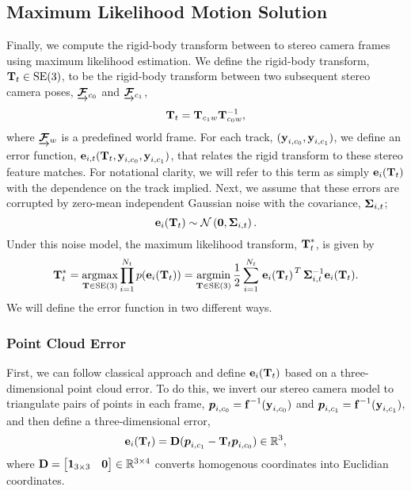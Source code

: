 \subsection{Maximum Likelihood Motion Solution}
Finally, we compute the rigid-body transform between to stereo camera frames using maximum likelihood estimation. We define the rigid-body transform, $\boldsymbol{\mathbf{T}}_t \in\text{SE}(3)$, to be the rigid-body transform between two subsequent stereo camera poses, 
$\underrightarrow{ \boldsymbol{\mathbf{\mathcal{F}}} }_{c_0}$ and  $\underrightarrow{ \boldsymbol{\mathbf{\mathcal{F}}} }_{c_1}$, 
\begin{equation}
	\boldsymbol{\mathbf{T}}_t = \boldsymbol{\mathbf{T}}_{c_1w} \boldsymbol{\mathbf{T}}^{-1}_{c_0w},
\end{equation}
where $\underrightarrow{ \boldsymbol{\mathbf{\mathcal{F}}} }_{w}$ is a predefined world frame. For each track, $(\boldsymbol{\mathbf{y}}_{i, c_0}, \boldsymbol{\mathbf{y}}_{i, c_1})$, we define an error function, $\boldsymbol{\mathbf{e}}_{i,t}(\boldsymbol{\mathbf{T}}_t, \boldsymbol{\mathbf{y}}_{i, c_0}, \boldsymbol{\mathbf{y}}_{i, c_1})$, that relates the rigid transform to these stereo feature matches. For notational clarity, we will refer to this term as simply $\boldsymbol{\mathbf{e}}_{i}(\boldsymbol{\mathbf{T}}_t)$ with the dependence on the track implied. Next, we assume that these errors are corrupted by zero-mean independent Gaussian noise with the covariance, $\boldsymbol{\mathbf{\Sigma}}_{i,t}$;
 \begin{equation}
  \boldsymbol{\mathbf{e}}_{i}(\boldsymbol{\mathbf{T}}_t) \sim
 \mathcal{N}\left(\boldsymbol{\mathbf{0}}, \boldsymbol{\mathbf{\Sigma}}_{i,t}\right). 
\end{equation}
Under this noise model, the maximum likelihood transform, $\boldsymbol{\mathbf{T}}^*_t$, is given by 
\begin{equation}
\label{eq:vo_objective}
  \boldsymbol{\mathbf{T}}_t^* = \operatorname*{argmax}_{\boldsymbol{\mathbf{T}}\in\text{SE}(3)}\prod_{i=1}^{N_t} p(\boldsymbol{\mathbf{e}}_{i}(\boldsymbol{\mathbf{T}}_t)) = \operatorname*{argmin}_{\boldsymbol{\mathbf{T}}\in\text{SE}(3)} \frac{1}{2} \sum_{i=1}^{N_t} 
  \left.{\boldsymbol{\mathbf{e}}_{i}(\boldsymbol{\mathbf{T}}_t)}\right.^T \boldsymbol{\mathbf{\Sigma}}_{i,t}^{-1} \boldsymbol{\mathbf{e}}_{i}(\boldsymbol{\mathbf{T}}_t).
\end{equation}
We will define the error function in two different ways.

\subsubsection{Point Cloud Error}
\label{sec:vo_point_cloud}
First, we can follow classical approach \citep{Maimone2007-tc} and define $ \boldsymbol{\mathbf{e}}_{i}(\boldsymbol{\mathbf{T}}_t) $ based on a three-dimensional point cloud error. To do this, we invert our stereo camera model to triangulate pairs of points in each frame, $\boldsymbol{p}_{i,c_0} = \boldsymbol{\mathbf{f}}^{-1}(\boldsymbol{\mathbf{y}}_{i, c_0})$ and $\boldsymbol{p}_{i,c_1} = \boldsymbol{\mathbf{f}}^{-1}(\boldsymbol{\mathbf{y}}_{i, c_1})$, and then define a three-dimensional error,
\begin{align}
	 \boldsymbol{\mathbf{e}}_{i}(\boldsymbol{\mathbf{T}}_t) = \boldsymbol{\mathbf{D}}(\boldsymbol{p}_{i,c_1} - \boldsymbol{\mathbf{T}}_t \boldsymbol{p}_{i,c_0}) \in \mathbb{R}{}^3,
\end{align}
where $\boldsymbol{\mathbf{D}} = \begin{bmatrix} \boldsymbol{\mathbf{1}}_{3\times3} & \boldsymbol{\mathbf{0}} \end{bmatrix} \in \mathbb{R}{}^{3\times4}$ converts homogenous coordinates into Euclidian coordinates.

